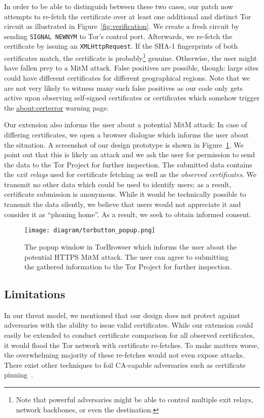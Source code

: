 \documentclass[letterpaper,twocolumn,10pt]{article}
\begin{document}
In order to be able to distinguish between these two cases, our patch now attempts to re-fetch the
certificate over at least one additional and distinct Tor circuit as illustrated in
Figure~\ref{fig:verification}.  We create a fresh circuit by sending \texttt{SIGNAL NEWNYM} to Tor's
control port.  Afterwards, we re-fetch the certificate by issuing an \texttt{XMLHttpRequest}.  If
the SHA-1 fingerprints of both certificates match, the certificate is probably\footnote{Note that
powerful adversaries might be able to control multiple exit relays, network backbones, or even the
destination.} genuine.  Otherwise, the user might have fallen prey to a MitM attack.
False positives are possible, though: large sites could have different certificates for different
geographical regions.  Note that we are not very likely to witness many such false positives as our
code only gets active upon observing self-signed certificates or certificates which somehow trigger
the \url{about:certerror} warning page.

Our extension also informs the user about a potential MitM attack: In case of differing
certificates, we open a browser dialogue which informs the user about the situation.  A screenshot
of our design prototype is shown in Figure~\ref{fig:popup}.  We point out that this is likely an
attack and we ask the user for permission to send the data to the Tor Project for further
inspection.  The submitted data contains the \emph{exit relays} used for certificate fetching as
well as the \emph{observed certificates}.  We transmit no other data which could be used to identify
users; as a result, certificate submission is anonymous.  While it would be technically possible to
transmit the data silently, we believe that users would not appreciate it and consider it as
``phoning home''.  As a result, we seek to obtain informed consent.

\begin{figure}[t]
	\centering
	\texttt{[image: diagram/torbutton\_popup.png]}
	\caption{The popup window in TorBrowser which informs the user about the potential HTTPS MitM
	attack.  The user can agree to submitting the gathered information to the Tor Project for
	further inspection.}
	\label{fig:popup}
\end{figure}

\subsection{Limitations}
In our threat model, we mentioned that our design does not protect against adversaries with the
ability to issue valid certificates.  While our extension could easily be extended to conduct
certificate comparison for all observed certificates, it would flood the Tor network with
certificate re-fetches.  To make matters worse, the overwhelming majority of these re-fetches would
not even expose attacks.  There exist other techniques to foil CA-capable adversaries such as
certificate pinning~\cite{pinning}.
\end{document}
